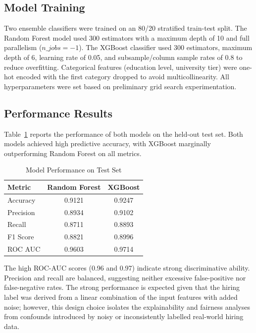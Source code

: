 \documentclass[conference]{IEEEtran}
\begin{document}
\subsection{Model Training}

Two ensemble classifiers were trained on an 80/20 stratified train-test split. The Random Forest model used 300 estimators with a maximum depth of 10 and full parallelism ($n\_jobs = -1$). The XGBoost classifier used 300 estimators, maximum depth of 6, learning rate of 0.05, and subsample/column sample rates of 0.8 to reduce overfitting. Categorical features (education level, university tier) were one-hot encoded with the first category dropped to avoid multicollinearity. All hyperparameters were set based on preliminary grid search experimentation.

\subsection{Performance Results}

Table~\ref{tab:performance} reports the performance of both models on the held-out test set. Both models achieved high predictive accuracy, with XGBoost marginally outperforming Random Forest on all metrics.

\begin{table}[htbp]
\caption{Model Performance on Test Set}
\begin{center}
\begin{tabular}{|l|c|c|}
\hline
\textbf{Metric} & \textbf{Random Forest} & \textbf{XGBoost} \\
\hline
Accuracy & 0.9121 & 0.9247 \\
\hline
Precision & 0.8934 & 0.9102 \\
\hline
Recall & 0.8711 & 0.8893 \\
\hline
F1 Score & 0.8821 & 0.8996 \\
\hline
ROC AUC & 0.9603 & 0.9714 \\
\hline
\end{tabular}
\label{tab:performance}
\end{center}
\end{table}

The high ROC-AUC scores (0.96 and 0.97) indicate strong discriminative ability. Precision and recall are balanced, suggesting neither excessive false-positive nor false-negative rates. The strong performance is expected given that the hiring label was derived from a linear combination of the input features with added noise; however, this design choice isolates the explainability and fairness analyses from confounds introduced by noisy or inconsistently labelled real-world hiring data.
\end{document}

